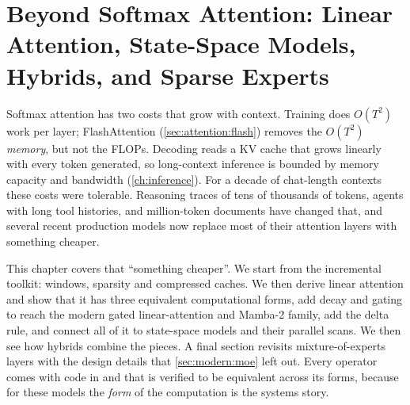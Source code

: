 \chapter{Beyond Softmax Attention: Linear Attention, State-Space Models, Hybrids, and Sparse Experts}\label{ch:attnalt}

Softmax attention has two costs that grow with context. Training does $O(T^2)$ work per layer; FlashAttention
(\cref{sec:attention:flash}) removes the $O(T^2)$ \emph{memory}, but not the FLOPs. Decoding reads a KV cache
that grows linearly with every token generated, so long-context inference is bounded by memory capacity and
bandwidth (\cref{ch:inference}). For a decade of chat-length contexts these costs were tolerable.
Reasoning traces of tens of thousands of tokens, agents with long tool histories, and million-token
documents have changed that, and several recent production models now replace most of their
attention layers with something cheaper.

This chapter covers that ``something cheaper''. We start from the incremental toolkit: windows,
sparsity and compressed caches. We then derive linear attention and show that it has three equivalent
computational forms, add decay and gating to reach the modern gated linear-attention and Mamba-2
family, add the delta rule, and connect all of it to state-space models and their parallel scans. We
then see how hybrids combine the pieces. A final section revisits mixture-of-experts layers with the
design details that \cref{sec:modern:moe} left out. Every operator comes with code in
 and  that is verified to be equivalent across its forms,
because for these models the \emph{form} of the computation is the systems story.

